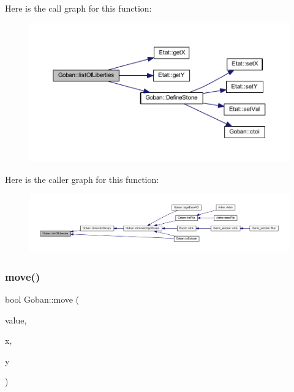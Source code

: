 Here is the call graph for this function\+:
\nopagebreak
\begin{figure}[H]
\begin{center}
\leavevmode
\includegraphics[width=350pt]{class_goban_a84f36324eb9ddc29f522d481f04c13e7_cgraph}
\end{center}
\end{figure}
Here is the caller graph for this function\+:
\nopagebreak
\begin{figure}[H]
\begin{center}
\leavevmode
\includegraphics[width=350pt]{class_goban_a84f36324eb9ddc29f522d481f04c13e7_icgraph}
\end{center}
\end{figure}
\mbox{\label{class_goban_a7dd1a7b53322bde2a831a923059e43a3}} 
\subsubsection{\texorpdfstring{move()}{move()}}
{\footnotesize\ttfamily bool Goban\+::move (\begin{DoxyParamCaption}\item[{const \hyperlink{class_etat_af3ddb2296ffc379b7f3ad2bf832f294e}{Etat\+::\+V\+AL} \&}]{value,  }\item[{const int \&}]{x,  }\item[{const int \&}]{y }\end{DoxyParamCaption})}

